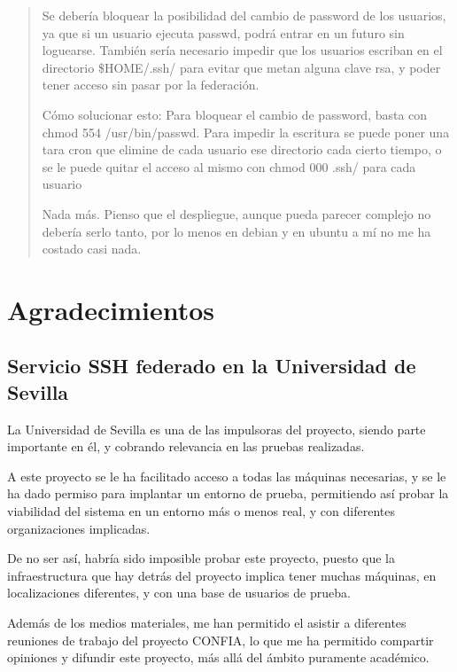 \begin{quote}
Se debería bloquear la posibilidad del cambio de password de los
usuarios, ya que si un usuario ejecuta passwd, podrá entrar en un futuro
sin loguearse.
También sería necesario impedir que los usuarios escriban en el
directorio \$HOME/.ssh/ para evitar que metan alguna clave rsa, y poder
tener acceso sin pasar por la federación.

Cómo solucionar esto:
Para bloquear el cambio de password, basta con chmod
554 /usr/bin/passwd.
Para impedir la escritura se puede poner una tara cron que elimine de
cada usuario ese directorio cada cierto tiempo, o se le puede quitar el
acceso al mismo con chmod 000 .ssh/ para cada usuario


Nada más. Pienso que el despliegue, aunque pueda parecer complejo no
debería serlo tanto, por lo menos en debian y en ubuntu a mí no me ha
costado casi nada.


    \end{quote}

\chapter{Agradecimientos}

\section{Servicio SSH federado en la Universidad de Sevilla}

    La Universidad de Sevilla es una de las impulsoras del proyecto, siendo
    parte importante en él, y cobrando relevancia en las pruebas
    realizadas.

    A este proyecto se le ha facilitado acceso a todas las máquinas
    necesarias, y se le ha dado permiso para implantar un entorno de
    prueba, permitiendo así probar la viabilidad del sistema en un entorno
    más o menos real, y con diferentes organizaciones implicadas.

    De no ser así, habría sido imposible probar este proyecto, puesto que
    la infraestructura que hay detrás del proyecto implica tener muchas
    máquinas, en localizaciones diferentes, y con una base de usuarios de
    prueba.

    Además de los medios materiales, me han permitido el asistir a
    diferentes reuniones de trabajo del proyecto CONFIA, lo que me ha
    permitido compartir opiniones y difundir este proyecto, más allá del
    ámbito puramente académico.


